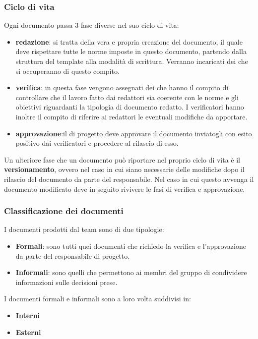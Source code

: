 \subsubsection{Ciclo di vita}
Ogni documento passa 3 fase  diverse nel suo ciclo di vita:
\begin{itemize}
\item\textbf{redazione}: si tratta della vera e propria creazione del documento, il quale deve rispettare tutte le norme imposte in questo documento, partendo dalla struttura del template alla modalità di scrittura. Verranno incaricati dei  che si occuperanno di questo compito.
\item\textbf{verifica}: in questa fase vengono assegnati dei  che hanno il compito di controllare che il lavoro fatto dai redattori sia coerente con le norme e gli obiettivi riguardanti la tipologia di documento redatto. I verificatori hanno inoltre il compito di riferire ai redattori le eventuali modifiche da apportare. 
\item\textbf{approvazione}:il  di progetto deve approvare il documento inviatogli con esito positivo dai verificatori e procedere al rilascio di esso.
\end{itemize}
Un ulteriore fase che un documento può riportare nel proprio ciclo di vita è il \textbf{versionamento}, ovvero nel caso in cui siano necessarie delle modifiche dopo il rilascio del documento da parte del responsabile. Nel caso in cui questo avvenga il documento modificato deve in seguito rivivere le fasi di verifica e approvazione.


\subsubsection{Classificazione dei documenti}
I documenti prodotti dal team sono di due tipologie:
\begin{itemize}
\item\textbf{Formali}: sono tutti quei documenti che richiedo la verifica e l'approvazione da parte del responsabile di progetto. 
\item\textbf{Informali}: sono quelli che permettono ai membri del gruppo di condividere informazioni sulle decisioni prese.
\end{itemize}
I documenti formali e informali sono a loro volta suddivisi in:
\begin{itemize}
\item\textbf{Interni}
\item\textbf{Esterni}
\end{itemize}


